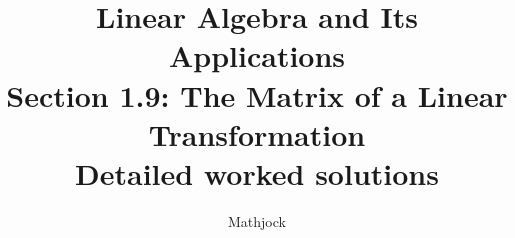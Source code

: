 
\title{\textbf{Linear Algebra and Its Applications}\\[0.3em]Section 1.9: The Matrix of a Linear Transformation\\[0.3em]\large Detailed worked solutions}
\author{Mathjock}
\date{}

\maketitle
\bookinfo
\tableofcontents
\clearpage
\renewcommand{\thesection}{1.\arabic{section}}
\renewcommand{\theHsection}{1.\arabic{section}}
\setcounter{section}{8}



